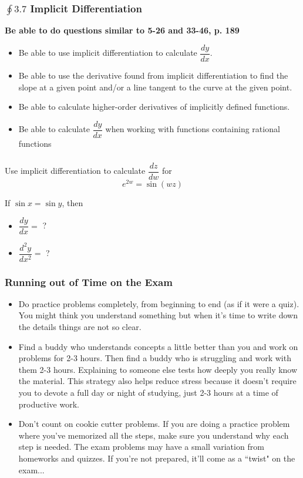 \documentclass[14pt]{beamer}
\begin{document}
\begin{frame}
\frametitle{\small $\oint 3.7$ Implicit Differentiation}
\small
{\bf Be able to do questions similar to 5-26 and 33-46, p. 189}

\begin{itemize}
\item Be able to use implicit differentiation to calculate $\dfrac{dy}{dx}.$
\item Be able to use the derivative found from implicit differentiation to find the slope at a given point and/or a line tangent to the curve at the given point.
\item Be able to calculate higher-order derivatives of implicitly defined functions.
\item Be able to calculate $\dfrac{dy}{dx}$ when working with functions containing rational functions
\end{itemize}
\end{frame}

\begin{frame}
\frametitle{}
\begin{exe} Use implicit differentiation to calculate $\dfrac{dz}{dw}$ for
\[e^{2w}=\sin(wz)\]
\end{exe}

\begin{exe} If $\sin x=\sin y$, then 
\begin{itemize}
\item $\dfrac{dy}{dx}=$ ? 

\vspace{1pc}
\item $\dfrac{d^2y}{dx^2}=$ ? 
\end{itemize}
\end{exe}

\end{frame}

\begin{frame}
\frametitle{Running out of Time on the Exam}
\footnotesize
\begin{itemize}
\item Do practice problems completely, from beginning to end (as if it were a quiz).  You might think you understand something but when it's time to write down the details things are not so clear.  
\item Find a buddy who understands concepts a little better than you and work on problems for 2-3 hours.  Then find a buddy who is struggling and work with them 2-3 hours.  Explaining to someone else tests how deeply you really know the material.  This strategy also helps reduce stress because it doesn't require you to devote a full day or night of studying, just 2-3 hours at a time of productive work.
\item Don't count on cookie cutter problems.  If you are doing a practice problem where you've memorized all the steps, make sure you understand why each step is needed.  The exam problems may have a small variation from homeworks and quizzes.  If you're not prepared, it'll come as a ``twist" on the exam...
\end{itemize}
\end{frame}
\end{document}
